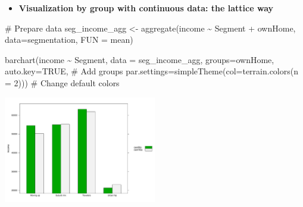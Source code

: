 \documentclass[
  ignorenonframetext,
]{beamer}
\newenvironment{Shaded}{\begin{snugshade}}{\end{snugshade}}
\newcommand{\AttributeTok}[1]{\textcolor[rgb]{0.40,0.45,0.13}{#1}}
\newcommand{\CommentTok}[1]{\textcolor[rgb]{0.37,0.37,0.37}{#1}}
\newcommand{\ConstantTok}[1]{\textcolor[rgb]{0.56,0.35,0.01}{#1}}
\newcommand{\DecValTok}[1]{\textcolor[rgb]{0.68,0.00,0.00}{#1}}
\newcommand{\FunctionTok}[1]{\textcolor[rgb]{0.28,0.35,0.67}{#1}}
\newcommand{\NormalTok}[1]{\textcolor[rgb]{0.00,0.23,0.31}{#1}}
\newcommand{\OtherTok}[1]{\textcolor[rgb]{0.00,0.23,0.31}{#1}}
\newcommand{\SpecialCharTok}[1]{\textcolor[rgb]{0.37,0.37,0.37}{#1}}
\providecommand{\tightlist}{%
  \setlength{\itemsep}{0pt}\setlength{\parskip}{0pt}}\usepackage{longtable,booktabs,array}
\begin{document}
\begin{frame}[fragile]{}
\label{section-17}
\begin{itemize}
\tightlist
\item
  \textbf{Visualization by group with continuous data: the lattice way}
\end{itemize}

\tiny

\begin{Shaded}
\begin{Highlighting}[]
\CommentTok{\# Prepare data}
\NormalTok{seg\_income\_agg }\OtherTok{\textless{}{-}} \FunctionTok{aggregate}\NormalTok{(income }\SpecialCharTok{\textasciitilde{}}\NormalTok{ Segment }\SpecialCharTok{+}\NormalTok{ ownHome, }
                            \AttributeTok{data=}\NormalTok{segmentation, }\AttributeTok{FUN =}\NormalTok{ mean)}
\end{Highlighting}
\end{Shaded}

\begin{Shaded}
\begin{Highlighting}[]
\FunctionTok{barchart}\NormalTok{(income }\SpecialCharTok{\textasciitilde{}}\NormalTok{ Segment, }\AttributeTok{data =}\NormalTok{ seg\_income\_agg,}
         \AttributeTok{groups=}\NormalTok{ownHome, }\AttributeTok{auto.key=}\ConstantTok{TRUE}\NormalTok{, }\CommentTok{\# Add groups}
         \AttributeTok{par.settings=}\FunctionTok{simpleTheme}\NormalTok{(}\AttributeTok{col=}\FunctionTok{terrain.colors}\NormalTok{(}\AttributeTok{n =} \DecValTok{2}\NormalTok{))) }\CommentTok{\# Change default colors}
\end{Highlighting}
\end{Shaded}

\begin{center}
\includegraphics[width=0.5\textwidth,height=\textheight]{005_comparing_groups_tables_and_visualizations_files/figure-beamer/unnamed-chunk-18-1.pdf}
\end{center}
\end{frame}
\end{document}
